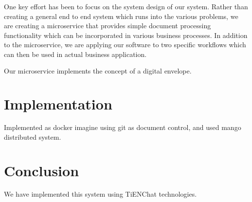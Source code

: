 \documentclass[journal]{IEEEtran}
\begin{document}
One key effort has been to focus on the system design of our system.
Rather than creating a general end to end system which runs into the
various problems, we are creating a microservice that provides simple
document processing functionality which can be incorporated in various
business processes.  In addition to the microservice, we are applying
our software to two specific workflows which can then be used in
actual business application.

Our microservice implements the concept of a digital envelope.



\section{Implementation}

Implemented as docker imagine using git as document control, and used
mango distributed system.

\section{Conclusion}
We have implemented this system using TiENChat technologies.
\end{document}
